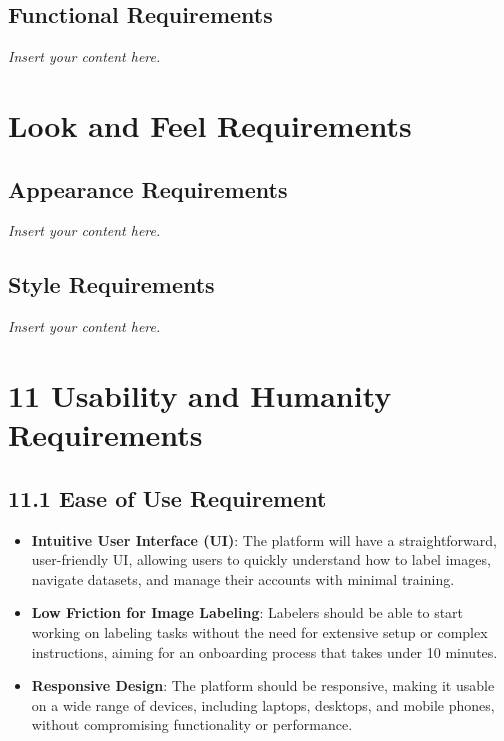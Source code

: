 \documentclass[12pt]{article}
\newcommand{\lips}{\textit{Insert your content here.}}
\begin{document}
\subsection{Functional Requirements}
\lips

\section{Look and Feel Requirements}
\subsection{Appearance Requirements}
\lips
\subsection{Style Requirements}
\lips

\section*{11 Usability and Humanity Requirements}

\subsection*{11.1 Ease of Use Requirement}
\begin{itemize}[leftmargin=2cm]
    \item \textbf{Intuitive User Interface (UI)}: The platform will have a straightforward, user-friendly UI, allowing users to quickly understand how to label images, navigate datasets, and manage their accounts with minimal training.
    \item \textbf{Low Friction for Image Labeling}: Labelers should be able to start working on labeling tasks without the need for extensive setup or complex instructions, aiming for an onboarding process that takes under 10 minutes.
    \item \textbf{Responsive Design}: The platform should be responsive, making it usable on a wide range of devices, including laptops, desktops, and mobile phones, without compromising functionality or performance.
\end{itemize}
\end{document}
